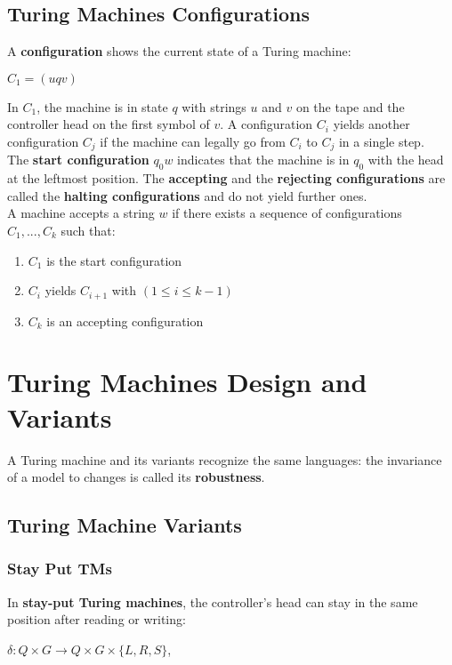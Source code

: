 \documentclass{article}
\begin{document}
\subsection{Turing Machines Configurations}
A \textbf{configuration} shows the current state of a Turing machine:
\begin{center}
    $C_1 = (uqv)$
\end{center}
In $C_1$, the machine is in state $q$ with strings $u$ and $v$ on the tape and the controller head on the first symbol of $v$. A configuration $C_i$ yields another configuration $C_j$ if the machine can legally go from $C_i$ to $C_j$ in a single step. \\
The \textbf{start configuration} $q_0w$ indicates that the machine is in $q_0$ with the head at the leftmost position. The \textbf{accepting} and the \textbf{rejecting configurations} are called the \textbf{halting configurations} and do not yield further ones. \\
A machine accepts a string $w$ if there exists a sequence of configurations $C_1, ..., C_k $ such that:
\begin{enumerate}
    \item $C_1$ is the start configuration
    \item $C_i$ yields $C_{i + 1}$ with $(1 \leq i \leq k - 1)$
    \item $C_k$ is an accepting configuration
\end{enumerate}

\newpage

\section{Turing Machines Design and Variants}
A Turing machine and its variants recognize the same languages: the invariance of a model to changes is called its \textbf{robustness}.
\subsection{Turing Machine Variants}
\subsubsection{Stay Put TMs}
In \textbf{stay-put Turing machines}, the controller's head can stay in the same position after reading or writing:
\begin{center}
    $\delta : Q \times G \rightarrow Q \times G \times \{L,R,S\}$,
\end{center}
\end{document}
